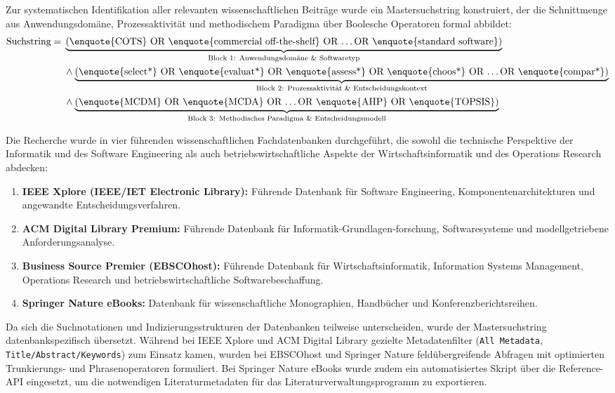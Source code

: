 Zur systematischen Identifikation aller relevanten wissenschaftlichen Beiträge wurde ein Mastersuchstring konstruiert, der die Schnittmenge aus Anwendungsdomäne, Prozessaktivität und methodischem Paradigma über Boolesche Operatoren formal abbildet:
\begin{align}
  \text{Suchstring} = \;&\underbrace{\text{(\enquote{COTS} OR \enquote{commercial off-the-shelf} OR \dots OR \enquote{standard software})}}_{\text{Block 1: Anwendungsdomäne \& Softwaretyp}} \notag \\
  &\land \underbrace{\text{(\enquote{select*} OR \enquote{evaluat*} OR \enquote{assess*} OR \enquote{choos*} OR \dots OR \enquote{compar*})}}_{\text{Block 2: Prozessaktivität \& Entscheidungskontext}} \notag \\
  &\land \underbrace{\text{(\enquote{MCDM} OR \enquote{MCDA} OR \dots OR \enquote{AHP} OR \enquote{TOPSIS})}}_{\text{Block 3: Methodisches Paradigma \& Entscheidungsmodell}} \notag
\end{align}

Die Recherche wurde in vier führenden wissenschaftlichen Fachdatenbanken durchgeführt, die sowohl die technische Perspektive der Informatik und des Software Engineering als auch betriebswirtschaftliche Aspekte der Wirtschaftsinformatik und des Operations Research abdecken:
\begin{enumerate}[label=\textbf{\arabic*.}, leftmargin=*]
  \item \textbf{IEEE Xplore (IEEE/IET Electronic Library):} Führende Datenbank für Software Engineering, Komponentenarchitekturen und angewandte Entscheidungsverfahren.
  \item \textbf{ACM Digital Library Premium:} Führende Datenbank für Informatik-Grundlagen-forschung, Softwaresysteme und modellgetriebene Anforderungsanalyse.
  \item \textbf{Business Source Premier (EBSCOhost):} Führende Datenbank für Wirtschaftsinformatik, Information Systems Management, Operations Research und betriebswirtschaftliche Softwarebeschaffung.
  \item \textbf{Springer Nature eBooks:} Datenbank für wissenschaftliche Monographien, Handbücher und Konferenzberichtsreihen.
\end{enumerate}

Da sich die Suchnotationen und Indizierungsstrukturen der Datenbanken teilweise unterscheiden, wurde der Mastersuchstring datenbankspezifisch übersetzt. Während bei IEEE Xplore und ACM Digital Library gezielte Metadatenfilter (\texttt{All Metadata}, \texttt{Title/Abstract/Keywords}) zum Einsatz kamen, wurden bei EBSCOhost und Springer Nature feldübergreifende Abfragen mit optimierten Trunkierungs- und Phrasenoperatoren formuliert. Bei Springer Nature eBooks wurde zudem ein automatisiertes Skript über die Reference-API eingesetzt, um die notwendigen Literaturmetadaten für das Literaturverwaltungsprogramm zu exportieren.

